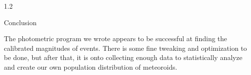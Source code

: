 \documentclass[final]{beamer}
\newlength{\twocolwid}
\begin{document}
\begin{frame}[t]
\begin{columns}[t]
\begin{column}{1.2\twocolwid}


\begin{block}{Conclusion}

The photometric program we wrote appears to be successful at finding the calibrated magnitudes of events. There is some fine tweaking and optimization to be done, but after that, it is onto collecting enough data to statistically analyze and create our own population distribution of meteoroids. 

\end{block}














\end{column}
\end{columns}
\end{frame}
\end{document}
